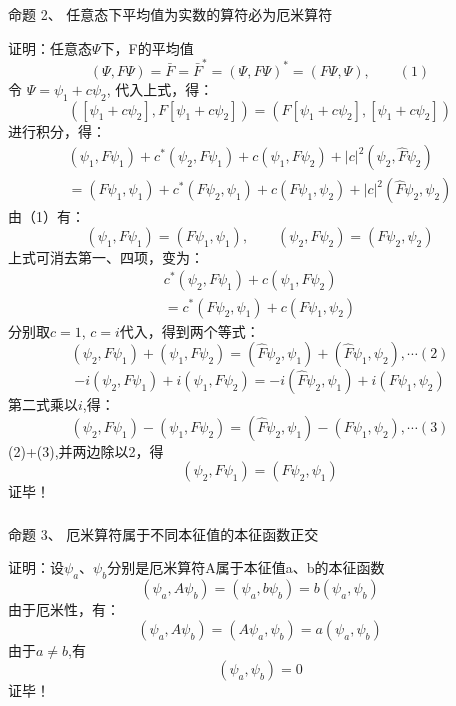\begin{frame} [allowframebreaks=]
    \frametitle{}
    \begin{tcolorbox1}{命题 2、}
    任意态下平均值为实数的算符必为厄米算符
    \end{tcolorbox1}
    \alert{证明：}任意态$\Psi$下，F的平均值
    $$(\Psi,F\Psi)=\bar{F}=\bar{F}^*=(\Psi,F\Psi)^*=(F\Psi,\Psi), \qquad (1) $$
    令 $\Psi= \psi_1+c\psi_2 $, 代入上式，得：
    $$([\psi_1+c\psi_2],F [\psi_1+c\psi_2])=(F[\psi_1+c\psi_2],[\psi_1+c\psi_2]) $$
    进行积分，得：
    $$
    \begin{array}{r}
    \left(\psi_{1}, F \psi_{1}\right)+c^{*}\left(\psi_{2}, F \psi_{1}\right)+c\left(\psi_{1}, F \psi_{2}\right)+|c|^{2}\left(\psi_{2}, \hat{F} \psi_{2}\right) \\
    =\left(F \psi_{1}, \psi_{1}\right)+c^{*}\left(F \psi_{2}, \psi_{1}\right)+c\left(F \psi_{1}, \psi_{2}\right)+|c|^{2}\left(\hat{F} \psi_{2}, \psi_{2}\right)
    \end{array}
    $$
    由（1）有： 
    $$(\psi_1,F\psi_1)=(F \psi_1, \psi_1), \qquad (\psi_2,F\psi_2)=(F \psi_2, \psi_2) $$
    上式可消去第一、四项，变为：
    $$\begin{array}{r}
        c^{*}\left(\psi_{2}, F \psi_{1}\right)+c\left(\psi_{1}, F \psi_{2}\right) \\
        =c^{*}\left(F \psi_{2}, \psi_{1}\right)+c\left(F \psi_{1}, \psi_{2}\right)
    \end{array}$$
    分别取$c=1$, $c=i$代入，得到两个等式：
    $$  \left(\psi_{2}, F \psi_{1}\right)+\left(\psi_{1}, F \psi_{2}\right) = 
    \left(\hat{F} \psi_{2}, \psi_{1}\right)+\left(\hat{F} \psi_{1}, \psi_{2}\right) , \cdots (2)
    $$
    $$
    -i\left(\psi_{2}, F \psi_{1}\right)+i\left(\psi_{1}, F \psi_{2}\right) 
    =-i\left(\hat{F} \psi_{2}, \psi_{1}\right)+i\left(F \psi_{1}, \psi_{2}\right)
    $$
    第二式乘以$i$,得：
    $$
    \left(\psi_{2}, F \psi_{1}\right)-\left(\psi_{1}, F \psi_{2}\right) 
    =\left(\hat{F} \psi_{2}, \psi_{1}\right)-\left(F \psi_{1}, \psi_{2}\right), \cdots (3)
    $$
    (2)+(3),并两边除以2，得
    $$
    \left(\psi_{2}, F \psi_{1}\right) =\left(F \psi_{2}, \psi_{1}\right)
    $$
    证毕！
\end{frame} 
\begin{frame} [allowframebreaks=]
    \frametitle{}
    \begin{tcolorbox1}{命题 3、}
    厄米算符属于不同本征值的本征函数正交
     \end{tcolorbox1}
    \alert{证明：}设$\psi_a$、$\psi_b$分别是厄米算符A属于本征值a、b的本征函数
    \begin{equation*}
        (\psi_a, A\psi_b)=(\psi_a, b\psi_b)=b(\psi_a, \psi_b)
    \end{equation*}  
    由于厄米性，有：
    \begin{equation*}
        (\psi_a, A\psi_b)=(A\psi_a, \psi_b)=a(\psi_a, \psi_b)
    \end{equation*}
    由于$a\neq b$,有
    \begin{equation*}
        (\psi_a, \psi_b)=0
    \end{equation*}
   证毕！
\end{frame} 


